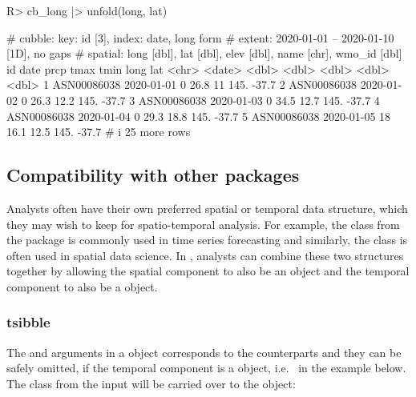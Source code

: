 \documentclass[
  shortnames]{jss}
\begin{document}
\begin{CodeChunk}
\begin{CodeInput}
R> cb_long |> unfold(long, lat)
\end{CodeInput}
\begin{CodeOutput}
# cubble:  key: id [3], index: date, long form
# extent:  2020-01-01 -- 2020-01-10 [1D], no gaps
# spatial: long [dbl], lat [dbl], elev [dbl], name [chr], wmo_id [dbl]
  id          date        prcp  tmax  tmin  long   lat
  <chr>       <date>     <dbl> <dbl> <dbl> <dbl> <dbl>
1 ASN00086038 2020-01-01     0  26.8  11    145. -37.7
2 ASN00086038 2020-01-02     0  26.3  12.2  145. -37.7
3 ASN00086038 2020-01-03     0  34.5  12.7  145. -37.7
4 ASN00086038 2020-01-04     0  29.3  18.8  145. -37.7
5 ASN00086038 2020-01-05    18  16.1  12.5  145. -37.7
# i 25 more rows
\end{CodeOutput}
\end{CodeChunk}

\hypertarget{compatibility-with-other-packages}{%
\subsection{Compatibility with other packages}\label{compatibility-with-other-packages}}

Analysts often have their own preferred spatial or temporal data structure, which they may wish to keep for spatio-temporal analysis. For example, the  class from the  package \citep{tsibble} is commonly used in time series forecasting and similarly, the  class \citep{sf} is often used in spatial data science. In , analysts can combine these two structures together by allowing the spatial component to also be an  object and the temporal component to also be a  object.

\hypertarget{tsibble}{%
\subsubsection{tsibble}\label{tsibble}}

The  and  arguments in a  object corresponds to the  counterparts and they can be safely omitted, if the temporal component is a  object, i.e.~ in the example below. The  class from the input will be carried over to the  object:
\end{document}
